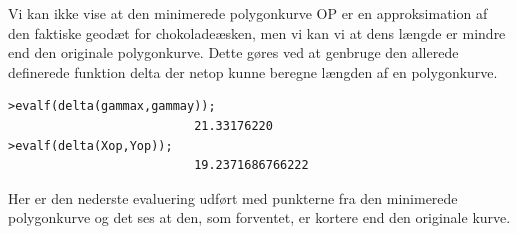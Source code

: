 Vi kan ikke vise at den minimerede polygonkurve OP er en approksimation af den faktiske geodæt for chokoladeæsken, men vi kan vi at dens længde er mindre end den originale polygonkurve.
Dette gøres ved at genbruge den allerede definerede funktion delta der netop kunne beregne længden af en polygonkurve.

\begin{lstlisting}[caption=Længden af den minimerede og ikke-minimerede polygonkurve]
>evalf(delta(gammax,gammay));
                          21.33176220
>evalf(delta(Xop,Yop));
                   		  19.2371686766222
\end{lstlisting}
Her er den nederste evaluering udført med punkterne fra den minimerede polygonkurve og det ses at den, som forventet, er kortere end den originale kurve.
